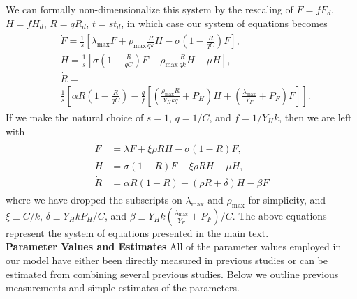 \documentclass[twocolumn,preprintnumbers,amsmath,amssymb,superscriptaddress]{revtex4}
\begin{document}
\begin{bibunit}[unsrt]
We can formally non-dimensionalize this system by the rescaling of $F=fF_{d}$, $H=fH_{d}$, $R=qR_{d}$, $t=st_{d}$, in which case our system of equations becomes
\begin{align}
\begin{split}
&\dot{F} = \frac{1}{s}\left[\lambda_{\text{max}} F + \rho_{\text{max}}\frac{R}{qk}H - \sigma \left(1-\frac{R}{qC}\right)F\right],  \\
&\dot{H} = \frac{1}{s}\left[\sigma \left(1-\frac{R}{qC}\right)F - \rho_{\text{max}}\frac{R}{qk} H - \mu H\right],  \\
& \dot{R} = \\
&\frac{1}{s}\left[\alpha R\left(1-\frac{R}{qC}\right) -\frac{q}{f}\left[\left(\frac{\rho_{\text{max}}R}{Y_{H}kq}+P_{H}\right)H+\left(\frac{\lambda_{\text{max}}}{Y_{F}}+P_{F}\right)F\right]\right].
\end{split}
\end{align}
If we make the natural choice of $s=1$, $q=1/C$, and $f=1/Y_{H}k$, then we are left with
\begin{align}
\begin{split}
\dot{F} &= \lambda F + \xi \rho RH - \sigma \left(1-R\right)F,  \\
\dot{H} &= \sigma \left(1-R\right)F - \xi \rho RH - \mu H,  \\
\dot{R} &= \alpha R\left(1-R\right) -\left(\rho R+\delta\right)H-\beta F
\label{reduceddynamics}
\end{split}
\end{align}
where we have dropped the subscripts on $\lambda_{\text{max}}$ and $\rho_{\text{max}}$ for simplicity, and $\xi\equiv C/k$, $\delta\equiv Y_{H}kP_{H}/C$, and $\beta\equiv Y_{H}k\left(\frac{\lambda_{\text{max}}}{Y_{F}}+P_{F}\right)/C$. The above equations represent the system of equations presented in the main text.
\\

{\bf Parameter Values and Estimates}
All of the parameter values employed in our model have either been directly measured in previous studies or can be estimated from combining several previous studies. Below we outline previous measurements and simple estimates of the parameters.


\end{bibunit}
\end{document}
